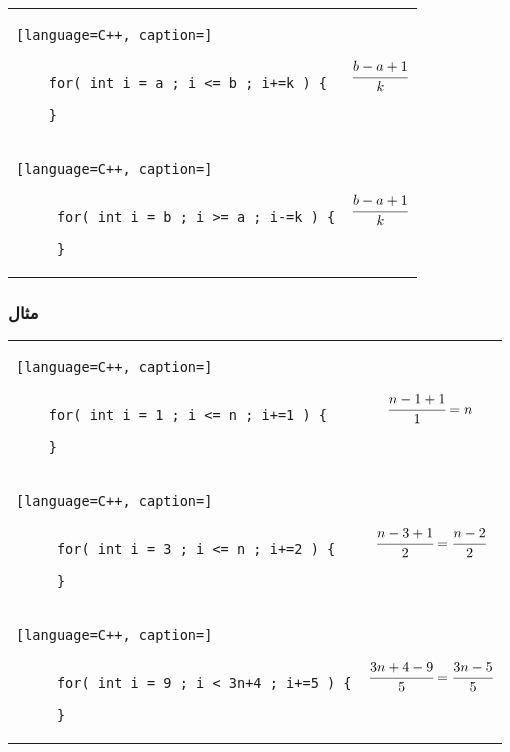 \documentclass[12pt]{book}
\begin{document}
\begin{latin}
\begin{center}
  \bgroup
  \def\arraystretch{1.5}%
  \begin{tabular}{ Y  C  }
    \begin{lstlisting}[language=C++, caption=]
    
    
	for( int i = a ; i <= b ; i+=k ) {
		
	}
	\end{lstlisting}
    &
    \colorbox{gray!10}{\parbox{90pt}{
    $$\cfrac{b - a + 1}{k}$$
    }}
     \\ 
     \begin{lstlisting}[language=C++, caption=]
     
     
     for( int i = b ; i >= a ; i-=k ) {
		
     }
	\end{lstlisting}
    &
    \colorbox{gray!10}{\parbox{90pt}{
    $$\cfrac{b - a + 1}{k}$$
    }}
     \\ 
  \end{tabular}
  \egroup
\end{center}
\end{latin}



\newpage

\subsubsection{مثال}



\begin{latin}
\begin{center}
  \bgroup
  \def\arraystretch{1.5}%
  \begin{tabular}{ Y  C  }
    \begin{lstlisting}[language=C++, caption=]
    
    
	for( int i = 1 ; i <= n ; i+=1 ) {
		
	}
	\end{lstlisting}
    &
    \colorbox{gray!10}{\parbox{90pt}{
    $$\cfrac{n - 1 + 1}{1} = n$$
    }}
     \\ 
     \begin{lstlisting}[language=C++, caption=]
     
     
     for( int i = 3 ; i <= n ; i+=2 ) {
		
     }
	\end{lstlisting}
    &
    \colorbox{gray!10}{\parbox{120pt}{
    $$\cfrac{n - 3 + 1}{2} = \cfrac{n - 2}{2}$$
    }}
     \\ 
     \begin{lstlisting}[language=C++, caption=]
     
     
     for( int i = 9 ; i < 3n+4 ; i+=5 ) {
		
     }
	\end{lstlisting}
    &
    \colorbox{gray!10}{\parbox{130pt}{
    $$\cfrac{3n+4 - 9}{5} = \cfrac{3n - 5}{5}$$
    }}
     \\ 
  \end{tabular}
  \egroup
\end{center}
\end{latin}
\end{document}

